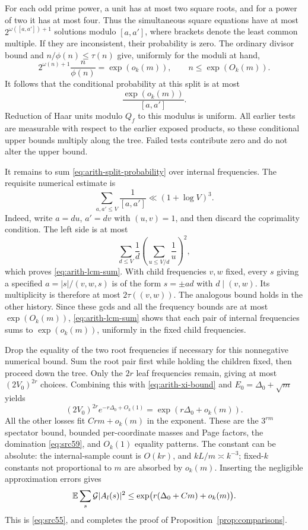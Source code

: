 For each odd prime power, a unit has at most two square roots, and for a
power of two it has at most four. Thus the simultaneous square equations
have at most $2^{\omega([a,a'])+1}$ solutions modulo $[a,a']$, where brackets
denote the least common multiple. If they are inconsistent, their
probability is zero. The ordinary divisor bound and
$n/\phi(n)\leq\tau(n)$ give, uniformly for the moduli at hand,
\[
 2^{\omega(n)+1}\frac{n}{\phi(n)}=\exp(o_k(m)),
             \qquad n\leq\exp(O_k(m)).
\]
It follows that the conditional probability at this split is at most
\begin{equation}\label{eq:arith-split-probability}
                          \frac{\exp(o_k(m))}{[a,a']}.
\end{equation}
Reduction of Haar units modulo $Q_f$ to this modulus is uniform. All
earlier tests are measurable with respect to the earlier exposed products,
so these conditional upper bounds multiply along the tree. Failed tests
contribute zero and do not alter the upper bound.

It remains to sum \eqref{eq:arith-split-probability} over internal
frequencies. The requisite numerical estimate is
\begin{equation}\label{eq:arith-lcm-sum}
                  \sum_{a,a'\leq V}\frac1{[a,a']}
                           \ll(1+\log V)^3.
\end{equation}
Indeed, write $a=du$, $a'=dv$ with $(u,v)=1$, and then discard the
coprimality condition. The left side is at most
\[
                  \sum_{d\leq V}\frac1d
                       \left(\sum_{u\leq V/d}\frac1u\right)^2,
\]
which proves \eqref{eq:arith-lcm-sum}.
With child frequencies $v,w$ fixed, every $s$ giving a specified
$a=|s|/(v,w,s)$ is of the form $s=\pm ad$ with $d\mid(v,w)$.
Its multiplicity is therefore at most $2\tau((v,w))$. The analogous bound
holds in the other history. Since these gcds and all the frequency bounds
are at most $\exp(O_k(m))$, \eqref{eq:arith-lcm-sum} shows that each pair of
internal frequencies sums to $\exp(o_k(m))$, uniformly in the fixed child
frequencies.

Drop the equality of the two root frequencies if necessary for this
nonnegative numerical bound. Sum the root pair first while holding the
children fixed, then proceed down the tree. Only the $2r$ leaf frequencies
remain, giving at most $(2V_0)^{2r}$ choices. Combining this with
\eqref{eq:arith-xi-bound} and $E_0=\Delta_0+\sqrt m$ yields
\begin{equation}\label{eq:arith-leaf-budget}
 (2V_0)^{2r}e^{-r\Delta_0+O_k(1)}
                         =\exp(r\Delta_0+o_k(m)).
\end{equation}
All the other losses fit $Crm+o_k(m)$ in the exponent. These are the
$3^{rm}$ spectator bound, bounded per-coordinate masses and Page factors,
the domination \eqref{eq:src59}, and $O_k(1)$ equality patterns. The
constant can be absolute: the internal-sample count is $O(kr)$, and
$kL/m\asymp k^{-3}$; fixed-$k$ constants not proportional to $m$ are
absorbed by $o_k(m)$. Inserting the negligible approximation errors gives
\[
                  \mathbb E\sum_s\mathcal G|A_l(s)|^2
                    \leq\exp\bigl(r(\Delta_0+Cm)+o_k(m)\bigr).
\]
This is \eqref{eq:src55}, and completes the proof of
Proposition~\ref{prop:comparisons}.
